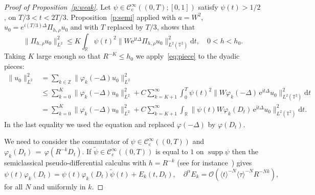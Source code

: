 \documentclass[10pt]{amsart}
\theoremstyle{definition}\newtheorem{defi}[theo]{Definition}\newtheorem{rema}[theo]{Remark}\newtheorem{exam}[theo]{Example}\newtheorem{exem}[theo]{Example}\newtheorem{nota}[theo]{Notation}
\DeclareMathOperator{\supp}{supp}
\newcommand{\CIc}{{\mathcal C}^\infty_{\mathrm{c}} }
\newcommand{\R}{{\mathbb R}}
\newcommand{\TT}{{\mathbb T}}
\newcommand{\ZZ}{{\mathbb Z}}
\newcommand*{\dd}{\mathrm{d}}
\newcommand*{\dt}{\dd t}
\begin{document}
\begin{proof}[Proof of Proposition~\ref{p:weak}]
Let $\psi \in \CIc ((0, T) ; [0, 1]) $ satisfy $\psi (t) > 1/2$, on $ T/3 < t < 2T / 3 $. Proposition~\ref{p:semi} applied with $ a = W^2 $, $ u_0 = e^{ i (T/3) \Delta } \Pi_{h, \rho } u_0 $ and with $ T $ replaced by $ T/3 $, shows that
\begin{equation}\label{eq:piece}
\|\Pi_{h, \rho } u_0\|_{L^2}^2 \leq K \int_\R \psi(t)^2 \| W \mathrm{e}^{\mathrm{i} t \Delta } \Pi_{h, \rho } u_0\|_{L^2 (\TT^2) }^2 \dt, \quad 0 < h < h_0.
\end{equation}
Taking $K $ large enough so that $R^{-K } \leq h_{0}$ we apply~\eqref{eq:piece} to the dyadic pieces:
\begin{align*}
\|u_0 \|^2_{L^2} & =\sum_{ k \in \ZZ } \|\varphi_{k}(-\Delta)u_0\|_{L^2}^2 \\
&\leq \sum_{k=0}^{K } \|\varphi_{k}(-\Delta)u_0\|_{L^2}^2 +C
\sum_{k=K +1}^\infty \int_{0}^T \psi (t) ^2 \| W \varphi_{k}(-\Delta)\,
\mathrm{e}^{\mathrm{i}t \Delta } u_0\|_{L^2(\TT^2) } ^2 \dt \\
& = \sum_{k=0}^{K } \|\varphi_{k}(-\Delta)u_0\|_{L^2}^2 + C
\sum_{k=K +1}^\infty \int_\R \| \psi (t) W \varphi_{k}(D_t)
\,\mathrm{e}^{\mathrm{i}t \Delta } u_0\|_{L^2(\TT^2) } ^2 \dt.
\end{align*}
In the last equality we used the equation and replaced $ \varphi (-\Delta) $ by $
\varphi (D_t) $.

We need to consider the commutator of $ \psi \in \CIc ((0, T)) $ and $
\varphi_{k} (D_t)\,{=}\,\varphi (R^{-k} D_t) $. If $
\widetilde \psi \in \CIc ((0,T))$ is equal to $ 1 $ on $
\supp \psi$ then the semiclassical pseudo-differential calculus with $ h = R ^{-k}$ (see for instance~\cite[Chapter~4]{EZB}) gives
\begin{equation}\label{eq:wideps}
\psi (t) \varphi_{k} (D_t) = \psi (t) \varphi_{k} (D_t) \widetilde \psi (t) + E _k (t, D_t),\quad
\partial^\alpha E_k = {\mathcal O} (\langle t \rangle^{-N } \langle
\tau \rangle^{-N} R ^{- N k }),
\end{equation}
for all $ N$ and uniformly in $ k $.


\end{proof}
\end{document}
